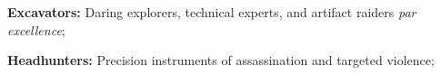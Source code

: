 \begin{columns}
\begin{squishitemize}
\item \textbf{Excavators:} Daring explorers, technical experts, and
  artifact raiders \emph{par excellence};

\item \textbf{Headhunters:} Precision instruments of assassination and
  targeted violence;
\end{squishitemize}


\noindent{}


\end{columns}
